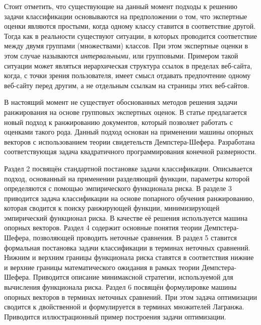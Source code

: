 \documentclass[12pt,a4paper,oneside]{article}
\begin{document}
\par
Стоит отметить, что существующие на данный момент подходы к решению задачи классификации основываются на предположении о том, что экспертные оценки являются простыми, когда одному классу ставится в соответствие другой. 
Тогда как в реальности существуют ситуации, в которых проводится соответствие между двумя группами (множествами) классов. 
При этом экспертные оценки в этом случае называются \emph{интервальными}, или групповыми. 
Примером такой ситуации может являться иерархическая структура ссылок в пределах веб-сайта, когда, с точки зрения пользователя, имеет смысл отдавать предпочтение одному веб-сайту перед другим, а не отдельным ссылкам на страницы этих веб-сайтов. 

\par
В настоящий момент не существует обоснованных методов решения задачи ранжирования на основе групповых экспертных оценок. 
В статье предлагается новый подход к ранжированию документов, который позволяет работать с оценками такого рода. 
Данный подход основан на применении машины опорных векторов с использованием теории свидетельств Демпстера-Шефера. 
Разработана соответствующая задача квадратичного программирования конечной размерности. 

\par
Раздел 2 посвящён стандартной постановке задачи классификации. 
Описывается подход, основанный на применении разделяющий функции, параметры которой определяются с помощью эмпирического функционала риска. 
В разделе 3 приводится задача классификации на основе попарного обучения ранжированию, которая сводится к поиску ранжирующей функции, минимизирующей эмпирический функционал риска. 
В качестве её решения используется машина опорных векторов. 
Раздел 4 содержит основные понятия теории Демпстера-Шефера, позволяющей проводить неточные сравнения. 
В раздел 5 ставится формальная постановка задачи классификации в терминах неточных сравнений. 
Нижним и верхним границы функционала риска ставятся в соответствия нижние и верхние границы математического ожидания в рамках теории Демпстера-Шефера. 
Приводится описание минимаксной стратегии, используемой для вычисления функционала риска. 
Раздел 6 посвящён формулировке машины опорных векторов в терминах неточных сравнений.
При этом задача оптимизации сводится к двойственной и формулируется в терминах множителей Лагранжа. 
Приводится иллюстрационный пример построения задачи оптимизации. 


\end{document}
